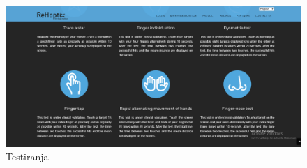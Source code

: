 	\begin{figure}[h]
	\centering
	\includegraphics[scale=0.3]{slike/rehaptix4.png}
	\caption{Testiranja}
	\end{figure}

		
		
	\eject
		
	